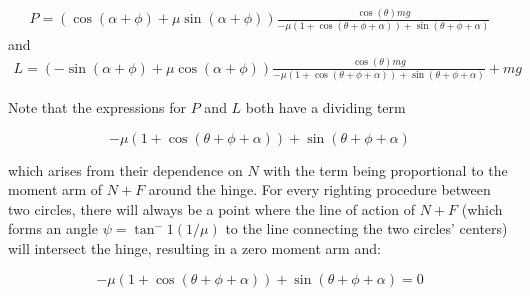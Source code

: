 \documentclass[letterpaper]{report}
\begin{document}
\begin{align}
P = ( \cos(\alpha+\phi) + \mu \sin(\alpha+\phi) ) \frac{\cos(\theta) m g}{-\mu (1+\cos(\theta + \phi + \alpha)) + \sin(\theta + \phi + \alpha)}
\end{align}
and
\begin{align}
L = ( -\sin(\alpha+\phi) + \mu \cos(\alpha+\phi) ) \frac{\cos(\theta) m g}{-\mu (1+\cos(\theta + \phi + \alpha)) + \sin(\theta + \phi + \alpha)} + mg
\end{align}

Note that the expressions for $P$ and $L$ both have a dividing term

$$-\mu (1+\cos(\theta + \phi + \alpha)) + \sin(\theta + \phi + \alpha)$$

which arises from their dependence on $N$ with the term being proportional to the moment arm of $N+F$ around the hinge.
For every righting procedure between two circles, there will always be a point where the line of action of $N+F$ (which forms an angle $\psi = \tan^-1(1/\mu)$ to the line connecting the two circles' centers) will intersect the hinge, resulting in a zero moment arm and:

$$-\mu (1+\cos(\theta + \phi + \alpha)) + \sin(\theta + \phi + \alpha) = 0$$
\end{document}
